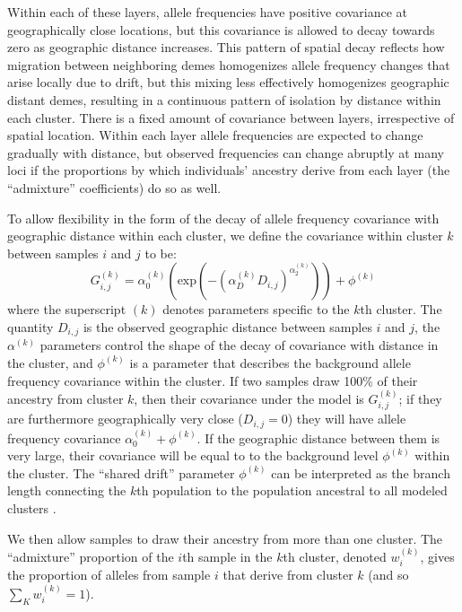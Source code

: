 \documentclass[12pt]{article}
\newcommand{\gb}[1]{{\it\color{magenta}{(#1)}}}
\newcommand{\plr}[1]{{\it\color{purple}{(#1)}}}
\newcommand{\gc}[1]{{\it\color{blue}{(#1)}}}
\begin{document}
Within each of these layers,
allele frequencies have positive covariance at geographically close locations,
but this covariance is allowed to decay towards zero as geographic distance increases.
This pattern of spatial decay reflects how migration between neighboring demes  
homogenizes allele frequency changes that arise locally due to drift, 
but this mixing less effectively homogenizes geographic distant demes,
resulting in a continuous pattern of isolation by distance within each cluster.
There is a fixed amount of covariance between layers, irrespective of spatial location.
Within each layer allele frequencies are expected to change gradually with distance,
but observed frequencies can change abruptly at many loci 
if the proportions by which individuals' ancestry derive from each layer 
(the ``admixture'' coefficients) 
do so as well.

To allow flexibility in the form of the decay of allele frequency covariance with geographic distance within each cluster, 
we define the covariance within cluster $k$ between samples $i$ and $j$ to be:
\begin{equation}
G^{(k)}_{i,j} 
    = 
    \alpha^{(k)}_0 \left( \text{exp} \left( -(\alpha^{(k)}_D D_{i,j}) ^ {\alpha^{(k)}_2}	\right) \right) + \phi^{(k)}
\label{within_cluster_covariance}
\end{equation}
where the superscript $(k)$ denotes parameters specific to the $k$th cluster.
The quantity $D_{i,j}$ is the observed geographic distance between samples $i$ and $j$,
the $\alpha^{(k)}$ parameters control the shape of the decay of covariance with distance in the cluster,
and $\phi^{(k)}$ is a parameter that describes the background allele frequency covariance within the cluster. 
If two samples draw 100\% of their ancestry from cluster $k$, then their covariance under the model is $G^{(k)}_{i,j}$;
if they are furthermore geographically very close ($D_{i,j}=0$)
they will have allele frequency covariance $\alpha^{(k)}_0 +  \phi^{(k)}$.
If the geographic distance between them is very large, 
their covariance will be equal to to the background level $\phi^{(k)}$ within the cluster.
The ``shared drift'' parameter $\phi^{(k)}$ can be interpreted as the branch length 
connecting the $k$th population to the population ancestral to all modeled
clusters \gc{(see XXX)}. \gb{is ``XXX" TreeMix? or one of the $f$stat papers?  or is it a figure?} 
\plr{an F-stat paper; also reference Ben Peters review}

We then allow samples to draw their ancestry from more than one cluster.
The ``admixture'' proportion of the $i$th sample in the $k$th cluster, denoted $w^{(k)}_i$,
gives the proportion of alleles from sample $i$ that derive from
cluster $k$ (and so $\sum_K w^{(k)}_i =1$).
\end{document}
